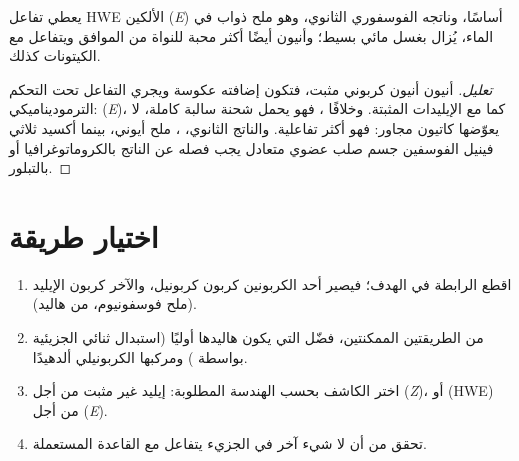 \begin{proposition}\label{prop:b2:wittig:hwe}
يعطي تفاعل HWE الألكين (\textit{E}) أساسًا، وناتجه الفوسفوري الثانوي، وهو ملح ذواب في
الماء، يُزال بغسل مائي بسيط؛ وأنيون  أيضًا أكثر محبة للنواة من
 الموافق ويتفاعل مع الكيتونات كذلك.
\end{proposition}

\begin{proof}[تعليل]
أنيون  أنيون كربوني مثبت، فتكون إضافته عكوسة ويجري التفاعل
تحت التحكم الترموديناميكي: (\textit{E})، كما مع الإيليدات المثبتة. وخلافًا ، فهو
يحمل شحنة سالبة كاملة، لا يعوّضها كاتيون مجاور: فهو أكثر تفاعلية. 
والناتج الثانوي، ، ملح أيوني، بينما أكسيد ثلاثي فينيل الفوسفين جسم صلب عضوي متعادل
يجب فصله عن الناتج بالكروماتوغرافيا أو بالتبلور.
\end{proof}

\section{اختيار طريقة}

\begin{method}\label{met:b2:wittig:wittig-disconnection}
\begin{enumerate}
  \item اقطع الرابطة  في الهدف؛ فيصير أحد الكربونين كربون كربونيل، والآخر كربون الإيليد
        (ملح فوسفونيوم، من هاليد).
  \item من الطريقتين الممكنتين، فضّل التي يكون هاليدها أوليًا (استبدال ثنائي الجزيئية بواسطة
        ) ومركبها الكربونيلي ألدهيدًا.
  \item اختر الكاشف بحسب الهندسة المطلوبة: إيليد غير مثبت من أجل (\textit{Z})، 
         أو  (HWE) من أجل (\textit{E}).
  \item تحقق من أن لا شيء آخر في الجزيء يتفاعل مع القاعدة المستعملة.
\end{enumerate}
\end{method}

